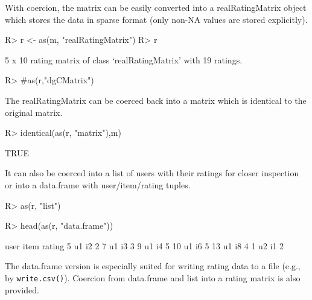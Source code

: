 \documentclass[nojss]{jss}
\newcommand{\func}[1]{\mbox{\texttt{#1()}}}
\begin{document}
With coercion, the matrix can be easily converted into
a realRatingMatrix object which stores the data in sparse
format (only non-NA values are stored explicitly).

\begin{Schunk}
\begin{Sinput}
R> r <- as(m, "realRatingMatrix")
R> r
\end{Sinput}
\begin{Soutput}
5 x 10 rating matrix of class ‘realRatingMatrix’ with 19 ratings.
\end{Soutput}
\begin{Sinput}
R> #as(r,"dgCMatrix")
\end{Sinput}
\end{Schunk}

The realRatingMatrix can be coerced back into a matrix which is
identical to the original matrix.
\begin{Schunk}
\begin{Sinput}
R> identical(as(r, "matrix"),m)
\end{Sinput}
\begin{Soutput}
[1] TRUE
\end{Soutput}
\end{Schunk}


It can also be coerced into a list
of users with their ratings for closer inspection
or
into a data.frame with user/item/rating tuples.
\begin{Schunk}
\begin{Sinput}
R> as(r, "list")
\end{Sinput}
\begin{Sinput}
R> head(as(r, "data.frame"))
\end{Sinput}
\begin{Soutput}
   user item rating
5    u1   i2      2
7    u1   i3      3
9    u1   i4      5
10   u1   i6      5
13   u1   i8      4
1    u2   i1      2
\end{Soutput}
\end{Schunk}

The data.frame version is especially suited for writing rating data to a
file (e.g., by \func{write.csv}).
Coercion from data.frame and list into a rating matrix is also provided.
\end{document}
